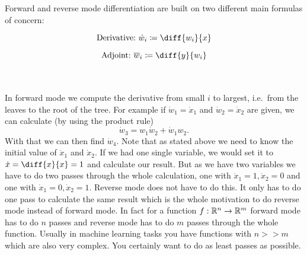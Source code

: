 \newcommand{\overw}[1]{\overline{w}_{#1}}
\newcommand{\diffyw}[1]{\diff{y}{w_{#1}}}
Forward and reverse mode differentiation are built on two different main formulas of concern:
\\
\begin{minipage}[c]{0.5\textwidth}
    \begin{equation*}
        \text{Derivative:}\ \dot w_i \coloneqq \diff{w_i}{x}
    \end{equation*}
\end{minipage}%
\begin{minipage}[c]{0.5\textwidth}
    \begin{equation*}
       \text{Adjoint:}\ \overw{i} \coloneqq \diffyw{i}
    \end{equation*}
\end{minipage}
\\ \\
In forward mode we compute the derivative from small $i$ to largest, i.e.\ from the leaves to the root of the tree. For example if $\dot w_1 = \dot x_1$ and $\dot w_2 = \dot x_2$ are given, we can calculate (by using the product rule)
\[ \dot w_3 = w_1 \dot w_2 + \dot w_1 w_2. \]
With that we can then find $\dot w_4$. Note that as stated above we need to know the initial value of $\dot x_1$ and $\dot x_2$. If we had one single variable, we would set it to $\dot x = \diff{x}{x} = 1$ and calculate our result. But as we have two variables we have to do two passes through the whole calculation, one with $\dot x_1 = 1, \dot x_2 = 0$ and one with $\dot x_1 = 0, \dot x_2 = 1$. Reverse mode does not have to do this. It only has to do one pass to calculate the same result which is the whole motivation to do reverse mode instead of forward mode. In fact for a function $f: \mathbb{R}^n \to \mathbb{R}^m$ forward mode has to do $n$ passes and reverse mode has to do $m$ passes through the whole function. Usually in machine learning tasks you have functions with $n >\! \!> m$ which are also very complex. You certainly want to do as least passes as possible.

